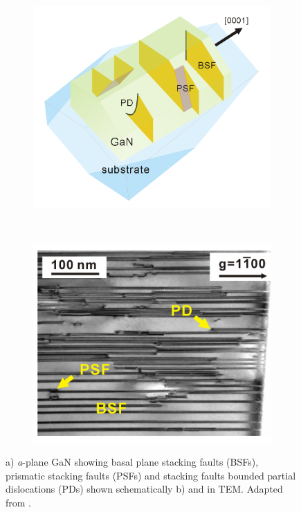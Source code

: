 \begin{figure}[h]
	\begin{subfigure}[t]{0.4\textwidth}
	\centering
	\includegraphics[width = 1\textwidth]{Figs/Ch1/bsf.png}
	\caption{}
	\end{subfigure}%
		\hspace*{1cm}
	~	
	\begin{subfigure}[t]{0.4\textwidth}
		\centering
		\includegraphics[width=1\textwidth]{Figs/Ch1/bsfTEM.png}
		\caption{}
	\end{subfigure}
	\caption {a) {\it a}-plane GaN showing basal plane stacking faults (BSFs), prismatic stacking faults (PSFs) and stacking faults bounded partial dislocations (PDs) shown schematically b) and in TEM. Adapted from \cite{Liu2011}.}
	\label{1.7}
\end{figure}
\FloatBarrier

